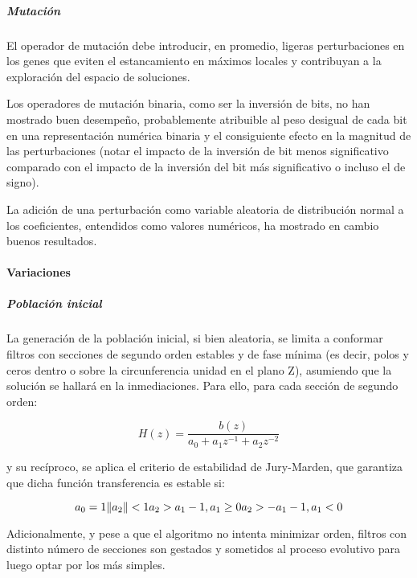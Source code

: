 \documentclass[11pt]{article}
\begin{document}
\subparagraph{Mutación}\label{mutaciuxf3n}

El operador de mutación debe introducir, en promedio, ligeras
perturbaciones en los genes que eviten el estancamiento en máximos
locales y contribuyan a la exploración del espacio de soluciones.

Los operadores de mutación binaria, como ser la inversión de bits, no
han mostrado buen desempeño, probablemente atribuible al peso desigual
de cada bit en una representación numérica binaria y el consiguiente
efecto en la magnitud de las perturbaciones (notar el impacto de la
inversión de bit menos significativo comparado con el impacto de la
inversión del bit más significativo o incluso el de signo).

La adición de una perturbación como variable aleatoria de distribución
normal a los coeficientes, entendidos como valores numéricos, ha
mostrado en cambio buenos resultados.

\paragraph{Variaciones}\label{variaciones}

\subparagraph{Población inicial}\label{poblaciuxf3n-inicial}

La generación de la población inicial, si bien aleatoria, se limita a
conformar filtros con secciones de segundo orden estables y de fase
mínima (es decir, polos y ceros dentro o sobre la circunferencia unidad
en el plano Z), asumiendo que la solución se hallará en la
inmediaciones. Para ello, para cada sección de segundo orden:


\begin{equation}
H(z) = \frac{b(z)}{a_0 + a_1 z^{-1} + a_2 z^{-2}}
\end{equation}


y su recíproco, se aplica el criterio de estabilidad de Jury-Marden, que
garantiza que dicha función transferencia es estable si:


\begin{equation}
a_0 = 1 \\
\|a_2\| < 1 \\
a_2 > a_1 - 1, a_1 \geq 0 \\
a_2 > -a_1 - 1, a_1 < 0
\end{equation}


Adicionalmente, y pese a que el algoritmo no intenta minimizar orden,
filtros con distinto número de secciones son gestados y sometidos al
proceso evolutivo para luego optar por los más simples.
\end{document}

